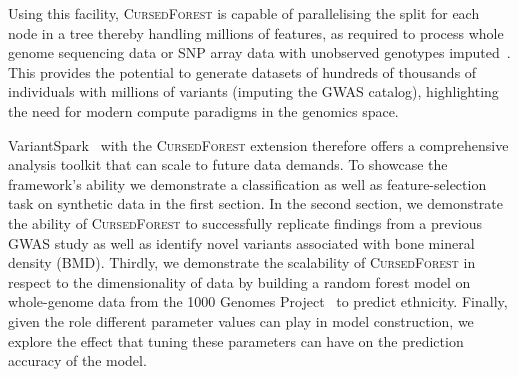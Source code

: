 \documentclass[10pt,letterpaper]{article}
\let\oldmarginpar\marginpar
\renewcommand\marginpar[1]{\-\oldmarginpar[\raggedleft\footnotesize #1]%
{\raggedright\footnotesize #1}}
\newcommand{\cursedforest}{\textsc{CursedForest}\xspace}
\newcommand{\mtry}{\texttt{mtry}\xspace}
\newcommand{\ntree}{\texttt{ntree}\xspace}
\begin{document}
Using this facility, \cursedforest is capable of parallelising the split for each node in a tree thereby handling millions 
of features, as required to process whole genome sequencing data or SNP array data with unobserved genotypes 
imputed~\cite{Howie2012}.  This provides the potential to generate datasets of hundreds of thousands of individuals 
with millions of variants (imputing the GWAS catalog), highlighting the need for modern
compute paradigms in the genomics space.


VariantSpark~\cite{OBrien2015} with the \cursedforest extension therefore offers a
comprehensive analysis toolkit that can scale to future data demands. To showcase the framework's ability we demonstrate
a classification as well as feature-selection task on synthetic data in the first section. In the second section, we demonstrate the ability of
\cursedforest to successfully replicate findings from a previous GWAS study as well as identify novel variants associated with bone 
mineral density (BMD). 
Thirdly, we demonstrate the scalability of \cursedforest in respect to the dimensionality of data by building a random
forest model on whole-genome data from the 1000 Genomes Project~\cite{1KG2012} to predict ethnicity.
Finally, given the role different parameter values can play in model construction, we explore the effect that tuning these
parameters can have on the prediction accuracy of the model.
\end{document}
